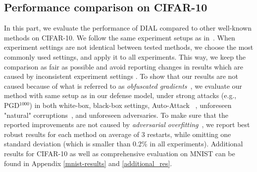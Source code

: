 

\subsection{Performance comparison on CIFAR-10} \label{defence-settings}
In this part, we evaluate the performance of DIAL compared to other well-known methods on CIFAR-10. 
We follow the same experiment setups as in~\cite{madry2017towards, wang2019improving, zhang2019theoretically}. When experiment settings are not identical between tested methods, we choose the most commonly used settings, and apply it to all experiments. This way, we keep the comparison as fair as possible and avoid reporting changes in results which are caused by inconsistent experiment settings \citep{pang2020bag}. To show that our results are not caused because of what is referred to as \textit{obfuscated gradients}~\citep{athalye2018obfuscated}, we evaluate our method with same setup as in our defense model, under strong attacks (e.g., PGD$^{1000}$) in both white-box, black-box settings, Auto-Attack ~\citep{croce2020reliable}, unforeseen "natural" corruptions~\citep{hendrycks2018benchmarking}, and unforeseen adversaries. To make sure that the reported improvements are not caused by \textit{adversarial overfitting}~\citep{rice2020overfitting}, we report best robust results for each method on average of 3 restarts, while omitting one standard deviation (which is smaller than 0.2\% in all experiments). Additional results for CIFAR-10 as well as comprehensive evaluation on MNIST can be found in Appendix \ref{mnist-results} and \ref{additional_res}.


